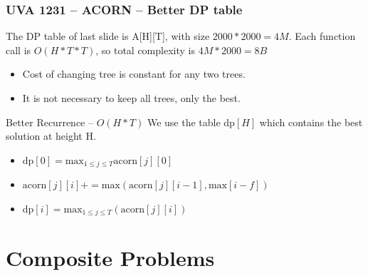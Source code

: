 \begin{frame}
  \frametitle{UVA 1231 -- ACORN -- Better DP table}

    \begin{alertblock}{}
      The DP table of last slide is A[H][T], with size $2000*2000=4M$.
      Each function call is $O(H*T*T)$, so total complexity is
      $4M*2000=8B$
    \end{alertblock}

    \medskip

    \begin{itemize}
    \item Cost of changing tree is constant for any two trees.
    \item It is not necessary to keep all trees, only the best.
    \end{itemize}

    \medskip

    \begin{block}{Better Recurrence -- $O(H*T)$}
      We use the table dp$[H]$ which contains the best solution at height H.

      \medskip

      \begin{itemize}
      \item $\text{dp}[0] = \text{max}_{1\leq j\leq T}\text{acorn}[j][0]$
       \medskip

      \item $\text{acorn}[j][i] += \text{max}(\text{acorn}[j][i-1], \text{max}[i-f])$
        \medskip

      \item $\text{dp}[i] = \text{max}_{1\leq j\leq T}(\text{acorn}[j][i])$
      \end{itemize}
    \end{block}
\end{frame}


\section{Composite Problems}
